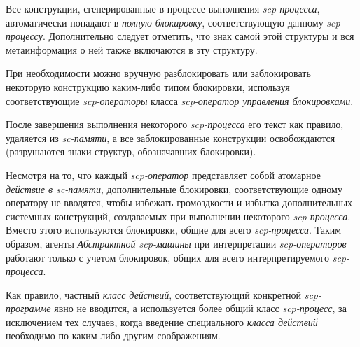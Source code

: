 \begin{SCn}
{\begin{scnitemize}
\item
  Все конструкции, сгенерированные в процессе выполнения
  \textit{scp-процесса}, автоматически попадают в \textit{полную
  блокировку}, соответствующую данному \textit{scp-процессу}.
  Дополнительно следует отметить, что знак самой этой структуры и вся метаинформация о ней также включаются в эту структуру.
\item
  При необходимости можно вручную разблокировать или заблокировать   некоторую конструкцию каким-либо типом блокировки, используя   соответствующие \textit{scp-операторы} класса \textit{scp-оператор управления
  блокировками}.
\item
  После завершения выполнения некоторого \textit{scp-процесса} его текст как
  правило, удаляется из \textit{sc-памяти}, а все заблокированные
  конструкции освобождаются (разрушаются знаки структур, обозначавших
  блокировки).
\item
  Несмотря на то, что каждый \textit{scp-оператор} представляет собой атомарное
 \textit{действие в sc-памяти}, дополнительные блокировки, соответствующие
  одному оператору не вводятся, чтобы избежать громоздкости и избытка
  дополнительных системных конструкций, создаваемых при выполнении
  некоторого \textit{scp-процесса}. Вместо этого используются блокировки, общие
  для всего \textit{scp-процесса}. Таким образом, агенты \textit{Абстрактной scp-машины}
  при интерпретации \textit{scp-операторов} работают только с учетом блокировок,
  общих для всего интерпретируемого \textit{scp-процесса}.
\item
  Как правило, частный \textit{класс действий}, соответствующий конкретной
  \textit{scp-программе} явно не вводится, а используется более общий
  класс \textit{scp-процесс}, за исключением тех случаев, когда введение
  специального \textit{класса действий} необходимо по каким-либо другим
  соображениям.
\end{scnitemize}}

\end{SCn}
